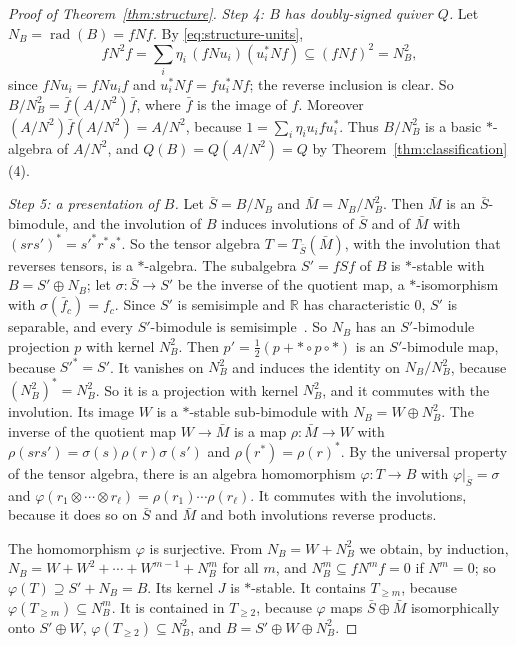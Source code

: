 \documentclass[12pt, a4paper]{report}
\theoremstyle{plain}
\theoremstyle{definition}
\theoremstyle{remark}
\theoremstyle{plain}
\newcommand{\rad}[0]{\operatorname{rad}} %
\newcommand{\RR}{\mathbb{R}}
\begin{document}
\begin{proof}[Proof of Theorem~\ref{thm:structure}]
\emph{Step 4: $B$ has doubly-signed quiver $Q$.} Let $N_B=\rad(B)=fNf$. By \eqref{eq:structure-units},
\[ fN^2f=\sum_i\eta_i\,(fNu_i)(u_i^*Nf)\subseteq(fNf)^2=N_B^2 , \]
since $fNu_i=fNu_if$ and $u_i^*Nf=fu_i^*Nf$; the reverse inclusion is clear. So $B/N_B^2=\bar f(A/N^2)\bar f$, where $\bar f$ is the image of $f$. Moreover $(A/N^2)\bar f(A/N^2)=A/N^2$, because $1=\sum_i\eta_iu_ifu_i^*$. Thus $B/N_B^2$ is a basic $*$-algebra of $A/N^2$, and $Q(B)=Q(A/N^2)=Q$ by Theorem~\ref{thm:classification}(4).

\emph{Step 5: a presentation of $B$.} Let $\bar S=B/N_B$ and $\bar M=N_B/N_B^2$. Then $\bar M$ is an $\bar S$-bimodule, and the involution of $B$ induces involutions of $\bar S$ and of $\bar M$ with $(srs')^*=s'^*r^*s^*$. So the tensor algebra $T=T_{\bar S}(\bar M)$, with the involution that reverses tensors, is a $*$-algebra. The subalgebra $S'=fSf$ of $B$ is $*$-stable with $B=S'\oplus N_B$; let $\sigma:\bar S\to S'$ be the inverse of the quotient map, a $*$-isomorphism with $\sigma(\bar f_c)=f_c$. Since $S'$ is semisimple and $\RR$ has characteristic $0$, $S'$ is separable, and every $S'$-bimodule is semisimple~\cite[Ch.~10]{Pierce1982}. So $N_B$ has an $S'$-bimodule projection $p$ with kernel $N_B^2$. Then $p'=\frac12(p+{*}\circ p\circ{*})$ is an $S'$-bimodule map, because $S'^*=S'$. It vanishes on $N_B^2$ and induces the identity on $N_B/N_B^2$, because $(N_B^2)^*=N_B^2$. So it is a projection with kernel $N_B^2$, and it commutes with the involution. Its image $W$ is a $*$-stable sub-bimodule with $N_B=W\oplus N_B^2$. The inverse of the quotient map $W\to\bar M$ is a map $\rho:\bar M\to W$ with $\rho(srs')=\sigma(s)\rho(r)\sigma(s')$ and $\rho(r^*)=\rho(r)^*$. By the universal property of the tensor algebra, there is an algebra homomorphism $\varphi:T\to B$ with $\varphi|_{\bar S}=\sigma$ and $\varphi(r_1\otimes\cdots\otimes r_\ell)=\rho(r_1)\cdots\rho(r_\ell)$. It commutes with the involutions, because it does so on $\bar S$ and $\bar M$ and both involutions reverse products.

The homomorphism $\varphi$ is surjective. From $N_B=W+N_B^2$ we obtain, by induction, $N_B=W+W^2+\cdots+W^{m-1}+N_B^m$ for all $m$, and $N_B^m\subseteq fN^mf=0$ if $N^m=0$; so $\varphi(T)\supseteq S'+N_B=B$. Its kernel $J$ is $*$-stable. It contains $T_{\geq m}$, because $\varphi(T_{\geq m})\subseteq N_B^m$. It is contained in $T_{\geq2}$, because $\varphi$ maps $\bar S\oplus\bar M$ isomorphically onto $S'\oplus W$, $\varphi(T_{\geq2})\subseteq N_B^2$, and $B=S'\oplus W\oplus N_B^2$.


\end{proof}
\end{document}
